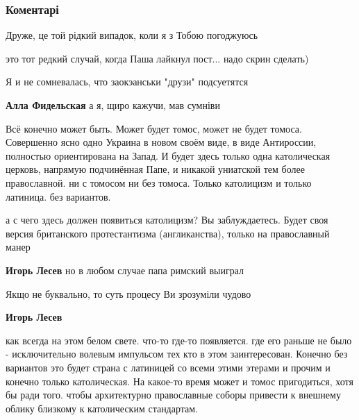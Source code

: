  
 
 
 
 
\subsubsection{Коментарі}

\begin{itemize} %
Друже, це той рідкий випадок, коли я з Тобою погоджуюсь

\begin{itemize} %

это тот редкий случай, когда Паша лайкнул пост... надо скрин сделать)

Я и не сомневалась, что заокэанськи "друзи" подсуетятся

\textbf{Алла Фидельская} а я, щиро кажучи, мав сумніви

\end{itemize} %


Всё конечно может быть. Может будет томос, может не будет томоса. Совершенно
ясно одно Украина в новом своём виде, в виде Антироссии, полностью
ориентирована на Запад. И будет здесь только одна католическая церковь,
напрямую подчинённая Папе, и никакой униатской тем более православной. ни с
томосом ни без томоса. Только католицизм и только латиница. без вариантов.

\begin{itemize} %

а с чего здесь должен появиться католицизм? Вы заблуждаетесь. Будет своя версия
британского протестантизма (англиканства), только на православный манер

\textbf{Игорь Лесев} но в любом случае папа римский выиграл

Якщо не буквально, то суть процесу Ви зрозуміли чудово

\textbf{Игорь Лесев} 

как всегда на этом белом свете. что-то где-то появляется. где его раньше не
было - исключительно волевым импульсом тех кто в этом заинтересован. Конечно
без вариантов это будет страна с латиницей со всеми этими этерами и прочим и
конечно только католическая. На какое-то время может и томос пригодиться, хотя
бы ради того. чтобы архитектурно православные соборы привести к внешнему облику
близкому к католическим стандартам.



\end{itemize}
\end{itemize}
